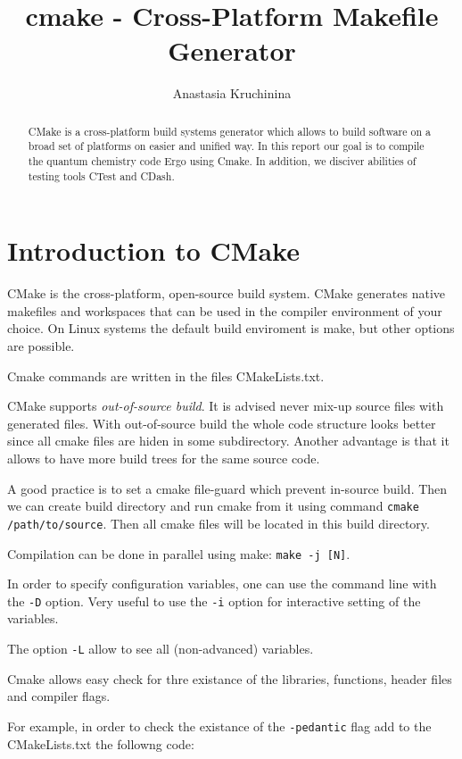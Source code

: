 \documentclass[a4paper,10pt]{article}
\title{cmake - Cross-Platform Makefile Generator}
\author{Anastasia Kruchinina}
\begin{document}
\maketitle

\begin{abstract}
CMake is a cross-platform build systems generator which allows to build software on a broad set of platforms on easier and unified way. In this report our goal is to compile the quantum chemistry code Ergo using Cmake. In addition, we disciver abilities of testing tools CTest and CDash.
\end{abstract}

\section{Introduction to CMake}

CMake is the cross-platform, open-source build system. CMake generates native makefiles and workspaces that can be used in the compiler environment of your choice. On Linux systems the default build enviroment is make, but other options are possible.


Cmake commands are written in the files CMakeLists.txt.

CMake supports \textit{out-of-source build}. It is advised never mix-up source files with generated files. With out-of-source build the whole code structure looks better since all cmake files are hiden in some subdirectory. Another advantage is that it allows to have more build trees for the same source code.

A good practice is to set a cmake file-guard which prevent in-source build. Then we can create build directory and run cmake from it using command \texttt{cmake /path/to/source}.
Then all cmake files will be located in this build directory.

Compilation can be done in parallel using make: \texttt{make -j [N]}.

In order to specify configuration variables, one can use the command line with the \texttt{-D} option. Very useful to use the \texttt{-i} option for interactive setting of the variables.

The option \texttt{-L} allow to see all (non-advanced) variables.


Cmake allows easy check for thre existance of the libraries, functions, header files and compiler flags.

For example, in order to check the existance of the \texttt{-pedantic} flag add to the CMakeLists.txt the followng code:
\end{document}
